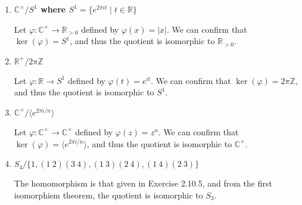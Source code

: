 \documentclass[a4paper,12pt]{article}
\begin{document}
\begin{enumerate}
\begin{enumerate}
            \item
                \boldmath
                \textbf{$\mathbb{C}^\times/S^1$ where $S^1 = \{ e^{2\pi it} \mid t \in \mathbb{R} \}$} \par
                \unboldmath
                Let $\varphi : \mathbb{C}^\times \to \mathbb{R}_{>0}$ defined by $\varphi(x) = |x|$. We can confirm that $\ker(\varphi) = S^1$, and thus the quotient is isomorphic to $\mathbb{R}_{>0}$. 

            \item
                \boldmath
                \textbf{$\mathbb{R}^+/2\pi \mathbb{Z}$} \par
                \unboldmath
                Let $\varphi : \mathbb{R} \to S^1$ defined by $\varphi(t) = e^{it}$. We can confirm that $\ker(\varphi) = 2\pi\mathbb{Z}$, and thus the quotient is isomorphic to $S^1$. 

            \item
                \boldmath
                \textbf{$\mathbb{C}^\times / \langle e^{2\pi i/n} \rangle$} \par
                \unboldmath
                Let $\varphi : \mathbb{C}^\times \to \mathbb{C}^\times$ defined by $\varphi(z) = z^n$. We can confirm that $\ker(\varphi) = \langle e^{2\pi i/n} \rangle$, and thus the quotient is isomorphic to $\mathbb{C}^\times$. 

            \item
                \boldmath
                \textbf{$S_4 / \{ 1, (1\ 2)(3\ 4), (1\ 3)(2\ 4), (1\ 4)(2\ 3) \}$} \par
                \unboldmath
                The homomorphism is that given in Exercise 2.10.5, and from the first isomorphism theorem, the quotient is isomorphic to $S_3$.


\end{enumerate}
\end{enumerate}
\end{document}
